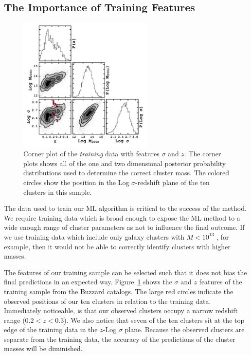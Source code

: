 \subsection{The Importance of Training Features}\label{2sec: training features}
\begin{figure}[t]
	\includegraphics[width=0.6\textwidth]{figures2/buzzardCorner.pdf}
	\caption{Corner plot of the \emph{training} data with features $\sigma$ and $z$. The corner plots shows all of the one and two dimensional posterior probability distributions used to determine the correct cluster mass. The colored circles show the position in the Log $\sigma$-redshift plane of the ten clusters in this sample.}
	\label{2fig:buzzardCorner}
\end{figure}

The data used to train our ML algorithm is critical to the success of the method. We require training data which is broad enough to expose the ML method to a wide enough range of cluster parameters as not to influence the final outcome. If we use training data which include only galaxy clusters with $M < 10^{13}$ \Msol, for example, then it would not be able to correctly identify clusters with higher masses. 

The features of our training sample can be selected such that it does not bias the final predictions in an expected way. Figure~\ref{2fig:buzzardCorner} shows the $\sigma$ and $z$ features of the training sample from the Buzzard catalogs. The large red circles indicate the observed positions of our ten clusters in relation to the training data. Immediately noticeable, is that our observed clusters occupy a narrow redshift range ($0.2< z <0.3$). We also notice that seven of the ten clusters sit at the top edge of the training data in the $z$-Log $\sigma$ plane. Because the observed clusters are separate from the training data, the accuracy of the predictions of the cluster masses will be diminished. 

